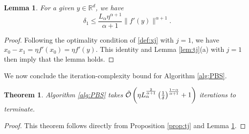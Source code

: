 \documentclass[11pt,letterpaper]{article}
\newtheorem{theorem}[thm]{Theorem}
\newtheorem{lemma}[thm]{Lemma}
\newcommand{\R}{\mathbb{R}}
\begin{document}
\begin{lemma}\label{lem:t1}
For a given $y\in \R^d$, we have
\[
\delta_1 \le \frac {L_\alpha \eta^{\alpha+1}}{\alpha+1} \|f'(y)\|^{\alpha+1}.
\]
\end{lemma}

\begin{proof}
Following the optimality condition of \eqref{def:xj} with $j=1$,
we have $x_0-x_1 = \eta f'(x_0) = \eta f'(y)$.
This identity and Lemma \ref{lem:tj}(a) with $j=1$ then imply that the lemma holds.
\end{proof}


We now conclude the iteration-complexity bound for Algorithm \ref{alg:PBS}. 

\begin{theorem}\label{thm:bundle}
Algorithm \ref{alg:PBS} takes $\tilde {\cal O}\left(\eta L_\alpha^{\frac{2}{\alpha+1}} \left(\frac{1}{\delta}\right)^{\frac{1-\alpha}{\alpha+1}} + 1\right)$ iterations to terminate.
\end{theorem}

\begin{proof}
    This theorem follows directly from Proposition \ref{prop:tj} and Lemma \ref{lem:t1}.
\end{proof}




\end{document}

